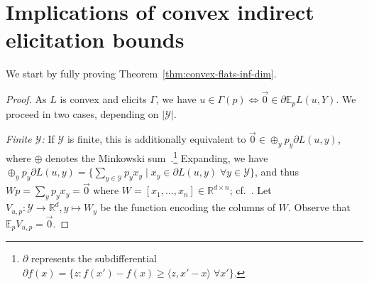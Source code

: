 \documentclass[11pt]{article} %
\newcommand{\reals}{\mathbb{R}}
\newcommand{\E}{\mathbb{E}}
\newcommand{\Y}{\mathcal{Y}}
\newcommand{\exploss}[3]{\E_{#3} #1(#2,Y)}
\newcommand{\inprod}[2]{\langle #1, #2 \rangle}
\begin{document}
\section{Implications of convex indirect elicitation bounds}\label{app:implications-of-bounds}

We start by fully proving Theorem~\ref{thm:convex-flats-inf-dim}.
\convexflats*
\begin{proof}
	As $L$ is convex and elicits $\Gamma$, we have $u \in \Gamma(p) \iff \vec 0 \in \partial \exploss{L}{u}{p}$. 
	We proceed in two cases, depending on $|\Y|$.
	
	\emph{Finite $\Y$: }
	If $\Y$ is finite, this is additionally equivalent to $\vec 0 \in \oplus_y p_y \partial L(u,y)$, where $\oplus$ denotes the Minkowski sum~\citep[Theorem 4.1.1]{hiriart2012fundamentals}.\footnote{$\partial$ represents the subdifferential $\partial f(x) = \{z : f(x') - f(x) \geq \inprod{z}{x'-x}\; \forall x' \}$.}
	Expanding, we have $\oplus_y p_y \partial L(u,y) = \{ \sum_{y\in\Y} p_y x_y \mid x_y \in \partial L(u,y) \; \forall y\in\Y\}$, and thus $W p = \sum_y p_y x_y = \vec 0$ where $W = [x_1, \ldots, x_n] \in \reals^{d\times n}$; cf.~\cite[$\mathbf{A}^m$ in Theorem 16]{ramaswamy2016convex}.
	Let $V_{u,p} : \Y \to \reals^d, y \mapsto W_y$ be the function encoding the columns of $W$.
	Observe that $\E_p V_{u,p} = \vec 0$.				
	

\end{proof}
\end{document}
